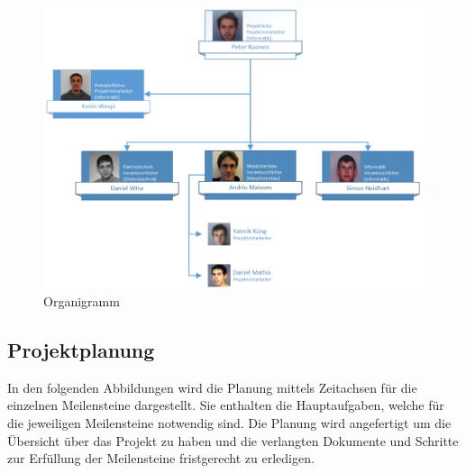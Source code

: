 \begin{figure}[h!]
    \centering
    \includegraphics[width=1.0\textwidth]{fig/Organigramm.png}
    \caption{Organigramm}
    \label{fig:Organigramm}
\end{figure}

\subsection{Projektplanung}
In den folgenden Abbildungen wird die Planung mittels Zeitachsen für die 
einzelnen Meilensteine dargestellt. Sie enthalten die Hauptaufgaben, welche 
für die jeweiligen Meilensteine notwendig sind. Die Planung wird angefertigt 
um die Übersicht über das Projekt zu haben und die verlangten Dokumente und 
Schritte zur Erfüllung der Meilensteine fristgerecht zu erledigen.

